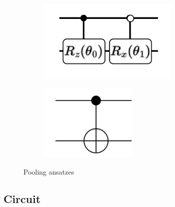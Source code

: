 \documentclass[
  13pt,
  a4paper,
  DIV=11,
  numbers=noendperiod,
  oneside]{scrreprt}
\begin{document}
\begin{figure}

\begin{minipage}{0.50\linewidth}

\begin{figure}[H]

{\centering \includegraphics[width=\textwidth,height=1.5625in]{chapters/../img/ansatz_pool.png}

}


\end{figure}%

\end{minipage}%
%
\begin{minipage}{0.50\linewidth}

\begin{figure}[H]

{\centering \includegraphics[width=\textwidth,height=1.45833in]{chapters/../img/ansatz_pool_simpler.png}

}


\end{figure}%

\end{minipage}%

\caption{\label{fig-pool-ansatz}Pooling ansatzes}

\end{figure}%

\subsection{Circuit}\label{circuit}
\end{document}

